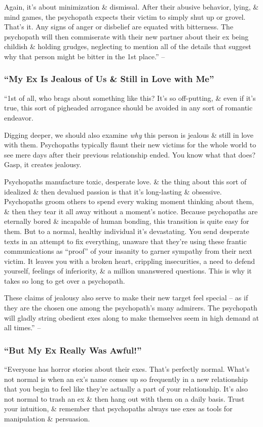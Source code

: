 \documentclass{article}
\numberwithin{equation}{section}
\begin{document}
Again, it's about minimization \& dismissal. After their abusive behavior, lying, \& mind games, the psychopath expects their victim to simply shut up or grovel. That's it. Any signs of anger or disbelief are equated with bitterness. The psychopath will then commiserate with their new partner about their ex being childish \& holding grudges, neglecting to mention all of the details that suggest why that person might be bitter in the 1st place.'' -- \cite[p. 34]{MacKenzie2015}

\subsubsection{``My Ex Is Jealous of Us \& Still in Love with Me''}
``1st of all, who brags about something like this? It's so off-putting, \& even if it's true, this sort of pigheaded arrogance should be avoided in any sort of romantic endeavor.

Digging deeper, we should also examine \textit{why} this person is jealous \& still in love with them. Psychopaths typically flaunt their new victims for the whole world to see mere days after their previous relationship ended. You know what that does? Gasp, it creates jealousy.

Psychopaths manufacture toxic, desperate love. \& the thing about this sort of idealized \& then devalued passion is that it's long-lasting \& obsessive. Psychopaths groom others to spend every waking moment thinking about them, \& then they tear it all away without a moment's notice. Because psychopaths are eternally bored \& incapable of human bonding, this transition is quite easy for them. But to a normal, healthy individual it's devastating. You send desperate texts in an attempt to fix everything, unaware that they're using these frantic communications as ``proof'' of your insanity to garner sympathy from their next victim. It leaves you with a broken heart, crippling insecurities, a need to defend yourself, feelings of inferiority, \& a million unanswered questions. This is why it takes so long to get over a psychopath.

These claims of jealousy also serve to make their new target feel special -- as if they are the chosen one among the psychopath's many admirers. The psychopath will gladly string obedient exes along to make themselves seem in high demand at all times.'' -- \cite[p. 34]{MacKenzie2015}

\subsubsection{``But My Ex Really Was Awful!''}
``Everyone has horror stories about their exes. That's perfectly normal. What's not normal is when an ex's name comes up so frequently in a new relationship that you begin to feel like they're actually a part of your relationship. It's also not normal to trash an ex \& then hang out with them on a daily basis. Trust your intuition, \& remember that psychopaths always use exes as tools for manipulation \& persuasion.
\end{document}
